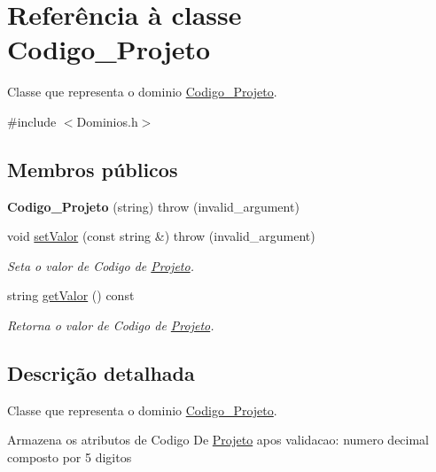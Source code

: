 \hypertarget{class_codigo___projeto}{
\section{\-Referência à classe \-Codigo\-\_\-\-Projeto}
\label{class_codigo___projeto}
}


\-Classe que representa o dominio \hyperlink{class_codigo___projeto}{\-Codigo\-\_\-\-Projeto}.  




{\ttfamily \#include $<$\-Dominios.\-h$>$}

\subsection*{\-Membros públicos}
\begin{DoxyCompactItemize}
\item 
\hypertarget{class_codigo___projeto_ac3aaa481366d852d0c654bac3f95bc97}{
{\bfseries \-Codigo\-\_\-\-Projeto} (string)  throw (invalid\-\_\-argument)}
\label{class_codigo___projeto_ac3aaa481366d852d0c654bac3f95bc97}

\item 
void \hyperlink{class_codigo___projeto_a8628c9fa45bb9be7c4b25ebfbe2c255c}{set\-Valor} (const string \&)  throw (invalid\-\_\-argument)
\begin{DoxyCompactList}\small\item\em \-Seta o valor de \-Codigo de \hyperlink{class_projeto}{\-Projeto}. \end{DoxyCompactList}\item 
string \hyperlink{class_codigo___projeto_ae2a6a32b20fcdd82dbafeef8cbec5bb2}{get\-Valor} () const 
\begin{DoxyCompactList}\small\item\em \-Retorna o valor de \-Codigo de \hyperlink{class_projeto}{\-Projeto}. \end{DoxyCompactList}\end{DoxyCompactItemize}


\subsection{\-Descrição detalhada}
\-Classe que representa o dominio \hyperlink{class_codigo___projeto}{\-Codigo\-\_\-\-Projeto}. 

\-Armazena os atributos de \-Codigo \-De \hyperlink{class_projeto}{\-Projeto} apos validacao\-: numero decimal composto por 5 digitos 

